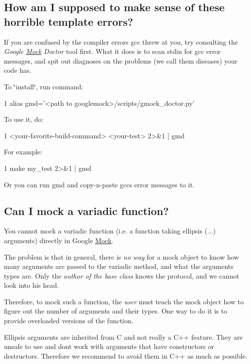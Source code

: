 \subsection*{How am I supposed to make sense of these horrible template errors?}

If you are confused by the compiler errors gcc threw at you, try consulting the {\itshape Google \hyperlink{class_mock}{Mock} Doctor} tool first. What it does is to scan stdin for gcc error messages, and spit out diagnoses on the problems (we call them diseases) your code has.

To \char`\"{}install\char`\"{}, run command\+: 
\begin{DoxyCode}
1 alias gmd='<path to googlemock>/scripts/gmock\_doctor.py'
\end{DoxyCode}


To use it, do\+: 
\begin{DoxyCode}
1 <your-favorite-build-command> <your-test> 2>&1 | gmd
\end{DoxyCode}


For example\+: 
\begin{DoxyCode}
1 make my\_test 2>&1 | gmd
\end{DoxyCode}


Or you can run {\ttfamily gmd} and copy-\/n-\/paste gcc\textquotesingle{}s error messages to it.

\subsection*{Can I mock a variadic function?}

You cannot mock a variadic function (i.\+e. a function taking ellipsis ({\ttfamily ...}) arguments) directly in Google \hyperlink{class_mock}{Mock}.

The problem is that in general, there is {\itshape no way} for a mock object to know how many arguments are passed to the variadic method, and what the arguments\textquotesingle{} types are. Only the {\itshape author of the base class} knows the protocol, and we cannot look into his head.

Therefore, to mock such a function, the {\itshape user} must teach the mock object how to figure out the number of arguments and their types. One way to do it is to provide overloaded versions of the function.

Ellipsis arguments are inherited from C and not really a C++ feature. They are unsafe to use and don\textquotesingle{}t work with arguments that have constructors or destructors. Therefore we recommend to avoid them in C++ as much as possible.

